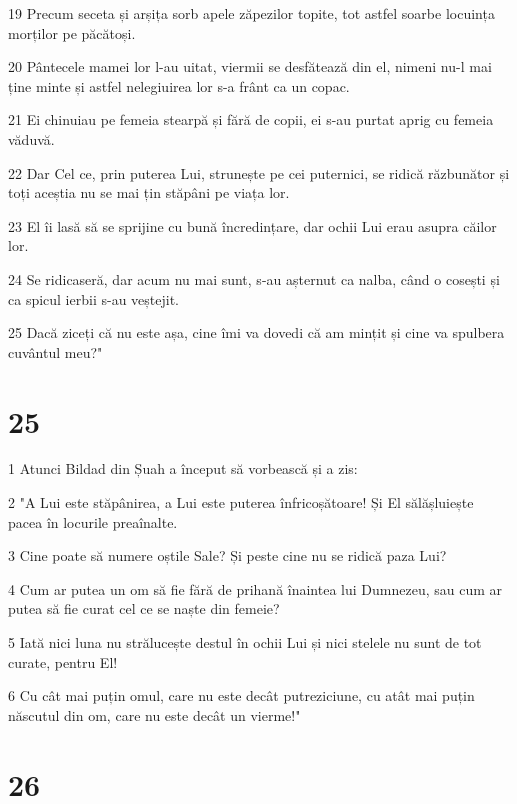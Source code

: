 \par 19 Precum seceta și arșița sorb apele zăpezilor topite, tot astfel soarbe locuința morților pe păcătoși.
\par 20 Pântecele mamei lor l-au uitat, viermii se desfătează din el, nimeni nu-l mai ține minte și astfel nelegiuirea lor s-a frânt ca un copac.
\par 21 Ei chinuiau pe femeia stearpă și fără de copii, ei s-au purtat aprig cu femeia văduvă.
\par 22 Dar Cel ce, prin puterea Lui, strunește pe cei puternici, se ridică răzbunător și toți aceștia nu se mai țin stăpâni pe viața lor.
\par 23 El îi lasă să se sprijine cu bună încredințare, dar ochii Lui erau asupra căilor lor.
\par 24 Se ridicaseră, dar acum nu mai sunt, s-au așternut ca nalba, când o cosești și ca spicul ierbii s-au veștejit.
\par 25 Dacă ziceți că nu este așa, cine îmi va dovedi că am mințit și cine va spulbera cuvântul meu?"

\chapter{25}

\par 1 Atunci Bildad din Șuah a început să vorbească și a zis:
\par 2 "A Lui este stăpânirea, a Lui este puterea înfricoșătoare! Și El sălășluiește pacea în locurile preaînalte.
\par 3 Cine poate să numere oștile Sale? Și peste cine nu se ridică paza Lui?
\par 4 Cum ar putea un om să fie fără de prihană înaintea lui Dumnezeu, sau cum ar putea să fie curat cel ce se naște din femeie?
\par 5 Iată nici luna nu strălucește destul în ochii Lui și nici stelele nu sunt de tot curate, pentru El!
\par 6 Cu cât mai puțin omul, care nu este decât putreziciune, cu atât mai puțin născutul din om, care nu este decât un vierme!"

\chapter{26}

